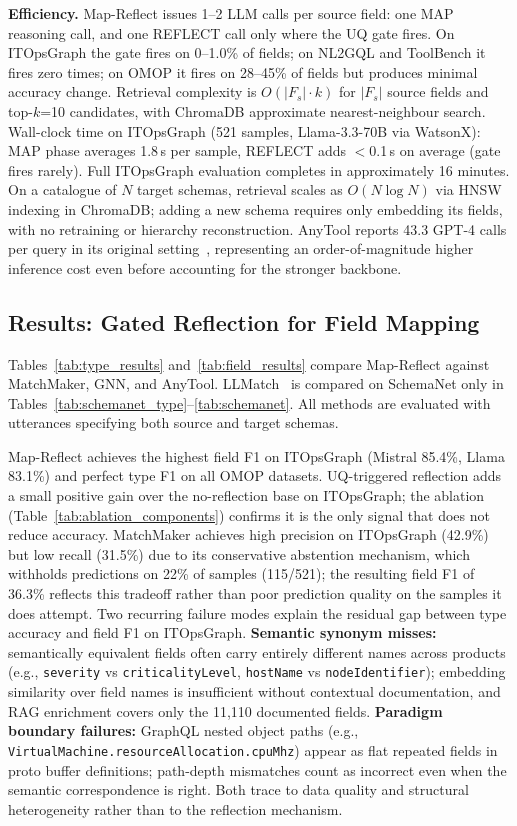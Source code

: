 \documentclass[sigconf, nonacm]{acmart}
\begin{document}
\textbf{Efficiency.} Map-Reflect issues 1--2 LLM calls per source field: one MAP reasoning call, and one REFLECT call only where the UQ gate fires. On ITOpsGraph the gate fires on 0--1.0\% of fields; on NL2GQL and ToolBench it fires zero times; on OMOP it fires on 28--45\% of fields but produces minimal accuracy change. Retrieval complexity is $O(|F_s| \cdot k)$ for $|F_s|$ source fields and top-$k$=10 candidates, with ChromaDB approximate nearest-neighbour search. Wall-clock time on ITOpsGraph (521 samples, Llama-3.3-70B via WatsonX): MAP phase averages 1.8\,s per sample, REFLECT adds $<$0.1\,s on average (gate fires rarely). Full ITOpsGraph evaluation completes in approximately 16 minutes. On a catalogue of $N$ target schemas, retrieval scales as $O(N \log N)$ via HNSW indexing in ChromaDB; adding a new schema requires only embedding its fields, with no retraining or hierarchy reconstruction. AnyTool reports 43.3 GPT-4 calls per query in its original setting~\cite{anytool}, representing an order-of-magnitude higher inference cost even before accounting for the stronger backbone.

\subsection{Results: Gated Reflection for Field Mapping}
\label{sec:results}

Tables~\ref{tab:type_results} and~\ref{tab:field_results} compare Map-Reflect against MatchMaker, GNN, and AnyTool. LLMatch~\cite{wang2025llmatch} is compared on SchemaNet only in Tables~\ref{tab:schemanet_type}--\ref{tab:schemanet}. All methods are evaluated with utterances specifying both source and target schemas.

Map-Reflect achieves the highest field F1 on ITOpsGraph (Mistral 85.4\%, Llama 83.1\%) and perfect type F1 on all OMOP datasets. UQ-triggered reflection adds a small positive gain over the no-reflection base on ITOpsGraph; the ablation (Table~\ref{tab:ablation_components}) confirms it is the only signal that does not reduce accuracy. MatchMaker achieves high precision on ITOpsGraph (42.9\%) but low recall (31.5\%) due to its conservative abstention mechanism, which withholds predictions on 22\% of samples (115/521); the resulting field F1 of 36.3\% reflects this tradeoff rather than poor prediction quality on the samples it does attempt. Two recurring failure modes explain the residual gap between type accuracy and field F1 on ITOpsGraph. \textbf{Semantic synonym misses:} semantically equivalent fields often carry entirely different names across products (e.g., \texttt{severity} vs \texttt{criticalityLevel}, \texttt{hostName} vs \texttt{nodeIdentifier}); embedding similarity over field names is insufficient without contextual documentation, and RAG enrichment covers only the 11,110 documented fields. \textbf{Paradigm boundary failures:} GraphQL nested object paths (e.g., \texttt{VirtualMachine.resourceAllocation.cpuMhz}) appear as flat repeated fields in proto buffer definitions; path-depth mismatches count as incorrect even when the semantic correspondence is right. Both trace to data quality and structural heterogeneity rather than to the reflection mechanism.
\end{document}
